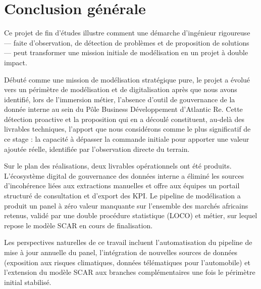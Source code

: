 \documentclass[../main.tex]{subfiles}
\begin{document}
\chapter*{Conclusion générale}

Ce projet de fin d'études illustre comment une démarche d'ingénieur rigoureuse ---
faite d'observation, de détection de problèmes et de proposition de solutions ---
peut transformer une mission initiale de modélisation en un projet à double impact.

Débuté comme une mission de modélisation stratégique pure, le projet a évolué vers
un périmètre de modélisation et de digitalisation après que nous avons identifié,
lors de l'immersion métier, l'absence d'outil de gouvernance de la donnée interne
au sein du Pôle Business Développement d'Atlantic Re. Cette détection proactive et
la proposition qui en a découlé constituent, au-delà des livrables techniques, l'apport
que nous considérons comme le plus significatif de ce stage : la capacité à dépasser
la commande initiale pour apporter une valeur ajoutée réelle, identifiée par
l'observation directe du terrain.

Sur le plan des réalisations, deux livrables opérationnels ont été produits.
L'écosystème digital de gouvernance des données interne a éliminé les sources
d'incohérence liées aux extractions manuelles et offre aux équipes un portail
structuré de consultation et d'export des KPI. Le pipeline de modélisation a produit
un panel à zéro valeur manquante sur l'ensemble des marchés africains retenus,
validé par une double procédure statistique (LOCO) et métier, sur lequel repose le
modèle SCAR en cours de finalisation.

Les perspectives naturelles de ce travail incluent l'automatisation du pipeline de
mise à jour annuelle du panel, l'intégration de nouvelles sources de données
(exposition aux risques climatiques, données télématiques pour l'automobile) et
l'extension du modèle SCAR aux branches complémentaires une fois le périmètre initial
stabilisé.

\clearpage

\end{document}
